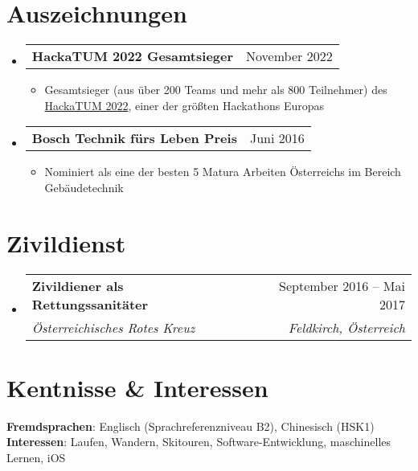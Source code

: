 \documentclass[letterpaper,11pt]{article}
\makeatletter
\newcommand{\resumeItem}[1]{
  \item\small{
    {#1 \vspace{-2pt}}
  }
}
\newcommand{\resumeSubheading}[4]{
  \vspace{-2pt}\item
    \begin{tabular*}{0.97\textwidth}[t]{l@{\extracolsep{\fill}}r}
      \textbf{#1} & #2 \\
      \textit{\small#3} & \textit{\small #4} \\
    \end{tabular*}\vspace{-7pt}
}
\newcommand{\resumeProjectHeading}[2]{
    \item
    \begin{tabular*}{0.97\textwidth}{l@{\extracolsep{\fill}}r}
      \small#1 & #2 \\
    \end{tabular*}\vspace{-7pt}
}
\newcommand{\resumeSubHeadingListStart}{\begin{itemize}[leftmargin=0.15in, label={}]}
\newcommand{\resumeSubHeadingListEnd}{\end{itemize}}
\newcommand{\resumeItemListStart}{\begin{itemize}}
\newcommand{\resumeItemListEnd}{\end{itemize}\vspace{-5pt}}
\makeatother
\begin{document}
\section{Auszeichnungen}
\resumeSubHeadingListStart
\resumeProjectHeading
{\textbf{HackaTUM 2022 Gesamtsieger}}{November 2022}
  \resumeItemListStart
    \resumeItem{Gesamtsieger (aus über 200 Teams und mehr als 800 Teilnehmer) des \href{https://devpost.com/software/sixtcharge}{HackaTUM 2022}, einer der größten Hackathons Europas}
  \resumeItemListEnd
  \resumeProjectHeading
  {\textbf{Bosch Technik fürs Leben Preis}}{Juni 2016}
  \resumeItemListStart
    \resumeItem{Nominiert als eine der besten 5 Matura Arbeiten Österreichs im Bereich Gebäudetechnik}
  \resumeItemListEnd
\resumeSubHeadingListEnd

\section{Zivildienst}
  \resumeSubHeadingListStart
    \resumeSubheading
      {Zivildiener als Rettungssanitäter}{September 2016 -- Mai 2017}
      {Österreichisches Rotes Kreuz}{Feldkirch, Österreich}
  \resumeSubHeadingListEnd

\section{Kentnisse \& Interessen}
 \begin{itemize}[leftmargin=0.15in, label={}]
    \small{\item{
      \textbf{Fremdsprachen}{: Englisch (Sprachreferenzniveau B2), Chinesisch (HSK1)} \\
     \textbf{Interessen}{: Laufen, Wandern, Skitouren, Software-Entwicklung, maschinelles Lernen, iOS}
    }}
 \end{itemize}


\end{document}
